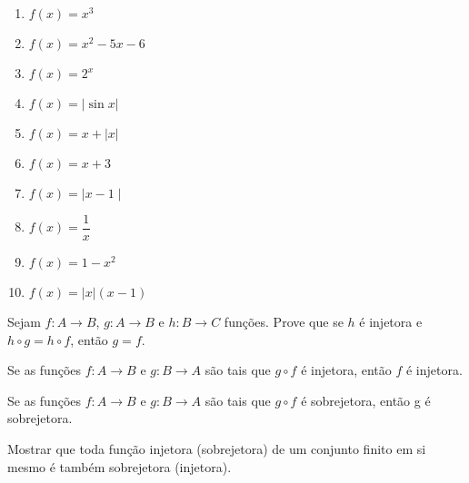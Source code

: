 \documentclass[12pt]{exam}
\begin{document}
    \begin{multicols}{2}
        \begin{enumerate}[label={\alph*})]
            \item $f(x) = x^3$
            \item $f(x) = x^2 - 5x - 6$
            \item $f(x) = 2^x$
            \item $f(x) = | \sin x |$
            \item $f(x) = x + | x |$
            \item $f(x) = x + 3$
            \item $f(x) = \mid x - 1\mid$
            \item $f(x) = \dfrac{1}{x}$
            \item $f(x) = 1 - x^2$
            \item $f(x) = |x|(x - 1)$
        \end{enumerate}
    \end{multicols}

    \vspace{.3cm}

    \questao{} Sejam $f : A \to B$, $g : A \to B$ e $h : B \to C$ fun\c{c}\~oes. Prove que se $h$ \'e injetora e $h \circ g = h \circ f$, ent\~ao $g = f$.

    \vspace{.3cm}

    \questao{} Se as fun{\c c}{\~o}es $f : A \to B$ e $g : B\to A$ s{\~a}o
    tais que $g\circ f$ {\'e} injetora, ent{\~a}o $f$ {\'e} injetora.

    \vspace{.3cm}

    \questao{} Se as fun{\c c}{\~o}es $f : A \to B$ e $g : B\to A$ s{\~a}o
    tais que $g\circ f$ {\'e} sobrejetora, ent{\~a}o g {\'e} sobrejetora.

    \vspace{.3cm}

    \questao{} Mostrar que toda fun{\c c}{\~a}o injetora (sobrejetora) de um conjunto finito em si mesmo {\'e} tamb{\'e}m sobrejetora (injetora).
\end{document}
